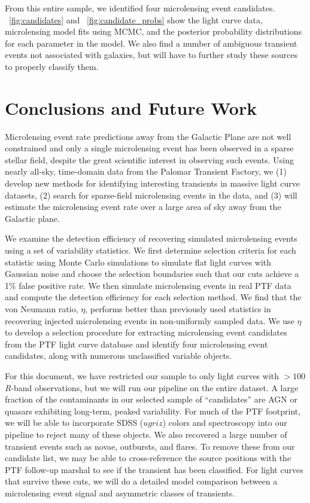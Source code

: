 \documentclass[12pt,preprint]{aastex}
\begin{document}
From this entire sample, we identified four microlensing event candidates. \figurename~\ref{fig:candidates} and \figurename~\ref{fig:candidate_probs} show the light curve data, microlensing model fits using MCMC, and the posterior probability distributions for each parameter in the model. We also find a number of ambiguous transient events not associated with galaxies, but will have to further study these sources to properly classify them.

\section{Conclusions and Future Work}
Microlensing event rate predictions away from the Galactic Plane are not well constrained and only a single microlensing event has been observed in a sparse stellar field, despite the great scientific interest in observing such events. Using nearly all-sky, time-domain data from the Palomar Transient Factory, we (1) develop new methods for identifying interesting transients in massive light curve datasets, (2) search for sparse-field microlensing events in the data, and (3) will estimate the microlensing event rate over a large area of sky away from the Galactic plane. 

We examine the detection efficiency of recovering simulated microlensing events using a set of variability statistics. We first determine selection criteria for each statistic using Monte Carlo simulations to simulate flat light curves with Gaussian noise and choose the selection boundaries such that our cuts achieve a 1\% false positive rate. We then simulate microlensing events in real PTF data and compute the detection efficiency for each selection method. We find that the von Neumann ratio, $\eta$, performs better than previously used statistics in recovering injected microlensing events in non-uniformly sampled data. We use $\eta$ to develop a selection procedure for extracting microlensing event candidates from the PTF light curve database and identify four microlensing event candidates, along with numerous unclassified variable objects.

For this document, we have restricted our sample to only light curves with $>100$ \textit{R}-band observations, but we will run our pipeline on the entire dataset. A large fraction of the contaminants in our selected sample of ``candidates'' are AGN or quasars exhibiting long-term, peaked variability. For much of the PTF footprint, we will be able to incorporate SDSS ($ugriz$) colors and spectroscopy into our pipeline to reject many of these objects. We also recovered a large number of transient events such as novae, outbursts, and flares. To remove these from our candidate list, we may be able to cross-reference the source positions with the PTF follow-up marshal to see if the transient has been classified. For light curves that survive these cuts, we will do a detailed model comparison between a microlensing event signal and asymmetric classes of transients. 
\end{document}
